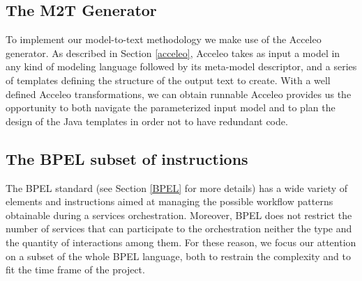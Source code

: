 \subsection{The M2T Generator}
To implement our model-to-text methodology we make use of the Acceleo generator. As described in Section \ref{acceleo}, Acceleo takes as input a model in any kind of modeling language followed by its meta-model descriptor, and a series of templates defining the structure of the output text to create.
With a well defined Acceleo transformations, we can obtain runnable 
Acceleo provides us the opportunity to both navigate the parameterized input model and to plan the design of the Java templates in order not to have redundant code.
\subsection{The BPEL subset of instructions}
\label{Sec:BPELsubset}
The BPEL standard (see Section \ref{BPEL} for more details) has a wide variety of elements and instructions aimed at managing the possible workflow patterns obtainable during a services orchestration. Moreover, BPEL does not restrict the number of services that can participate to the orchestration neither the type and the quantity of interactions among them.
For these reason, we focus our attention on a subset of the whole BPEL language, both to restrain the complexity and to fit the time frame of the project.
